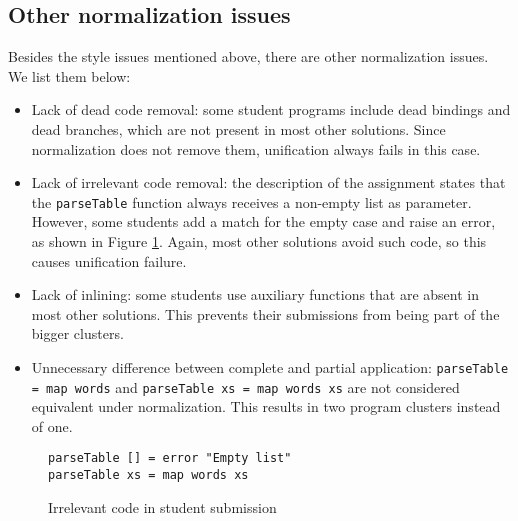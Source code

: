 
\subsection{Other normalization issues}

Besides the style issues mentioned above, there are other normalization issues. We list them below:

\begin{itemize}
    \item Lack of dead code removal: some student programs include dead bindings and dead branches, which are not present in most other solutions. Since normalization does not remove them, unification always fails in this case.
    \item Lack of irrelevant code removal: the description of the assignment states that the \texttt{parseTable} function always receives a non-empty list as parameter. However, some students add a match for the empty case and raise an error, as shown in Figure \ref{fig:irrelevant-code-error}. Again, most other solutions avoid such code, so this causes unification failure.
    \item Lack of inlining: some students use auxiliary functions that are absent in most other solutions. This prevents their submissions from being part of the bigger clusters.
    \item Unnecessary difference between complete and partial application: \texttt{parseTable = map words} and \texttt{parseTable xs = map words xs} are not considered equivalent under normalization. This results in two program clusters instead of one.
\end{itemize}

\begin{figure}[H]
\begin{verbatim}
parseTable [] = error "Empty list"
parseTable xs = map words xs
\end{verbatim}
\caption{Irrelevant code in student submission}
\label{fig:irrelevant-code-error}
\end{figure}



